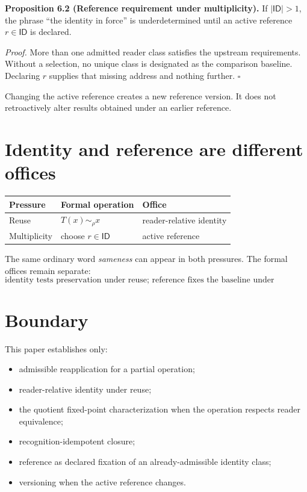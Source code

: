\documentclass[11pt]{article}
\newcommand{\ID}{\mathsf{ID}}
\begin{document}
\textbf{Proposition 6.2 (Reference requirement under multiplicity).}
If $|\ID|>1$, the phrase ``the identity in force'' is underdetermined until an active reference $r\in\ID$ is declared.

\textit{Proof.}
More than one admitted reader class satisfies the upstream requirements. Without a selection, no unique class is designated as the comparison baseline. Declaring $r$ supplies that missing address and nothing further. $\square$

Changing the active reference creates a new reference version. It does not retroactively alter results obtained under an earlier reference.

\section{Identity and reference are different offices}

\begin{center}
\begin{tabular}{@{}lll@{}}
\toprule
\textbf{Pressure} & \textbf{Formal operation} & \textbf{Office}\\
\midrule
Reuse & $T(x)\sim_\rho x$ & reader-relative identity\\
Multiplicity & choose $r\in\ID$ & active reference\\
\bottomrule
\end{tabular}
\end{center}

The same ordinary word \emph{sameness} can appear in both pressures. The formal offices remain separate:
\[
\boxed{
\text{identity tests preservation under reuse; reference fixes the baseline under alternatives.}
}
\]

\section{Boundary}

This paper establishes only:
\begin{itemize}
\item admissible reapplication for a partial operation;
\item reader-relative identity under reuse;
\item the quotient fixed-point characterization when the operation respects reader equivalence;
\item recognition-idempotent closure;
\item reference as declared fixation of an already-admissible identity class;
\item versioning when the active reference changes.
\end{itemize}
\end{document}
